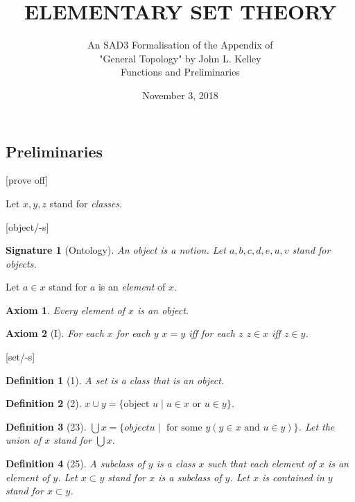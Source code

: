 \documentclass{scrartcl}
\newenvironment{forthel}{\begin{leftbar}}{\end{leftbar}}
\newtheorem*{axiom}{Axiom}
\newtheorem*{definition}{Definition}
\newtheorem*{signature}{Signature}
\begin{document}
\title{ELEMENTARY SET THEORY}

\subtitle{An SAD3 Formalisation of the Appendix of \\"General Topology" 
by John L. Kelley \\
Functions and Preliminaries}

\date{November 3, 2018}

\maketitle


\subsection{Preliminaries}

\begin{forthel}

[prove off]

Let $x,y,z$ stand for \emph{classes}.


[object/-s]
\begin{signature}[Ontology] An object is a notion.
Let $a,b,c,d,e,u,v$ stand for objects.
\end{signature}

Let $a \in x$ stand for $a$ is an \emph{element} of $x$.

\begin{axiom} Every element of $x$ is an object. \end{axiom}

\begin{axiom}[I]
For each $x$ for each $y$ $x = y$ iff for each $z$ 
$z \in x$ iff $z \in y$.
\end{axiom}

[set/-s]
\begin{definition}[1] A \emph{set} is a class that is an object.
\end{definition}


\begin{definition}[2] $x \cup y = \{\text{object } u \mid u \in x \text{ or } u \in y \}$.
\end{definition}

\begin{definition}[23] $\bigcup x = 
\{object u \mid \text{ for some } y (y \in x \text{ and } u \in y)\}$.
Let the \emph{union} of $x$ stand for $\bigcup x$.
\end{definition}

\begin{definition}[25] 
A \emph{subclass} of $y$ is a class $x$ such that each element of $x$ is an
element of $y$. Let $x \subset y$ stand for $x$ is a subclass of $y$.
Let $x$ is \emph{contained} in $y$ stand for $x \subset y$.
\end{definition}


\end{forthel}
\end{document}
